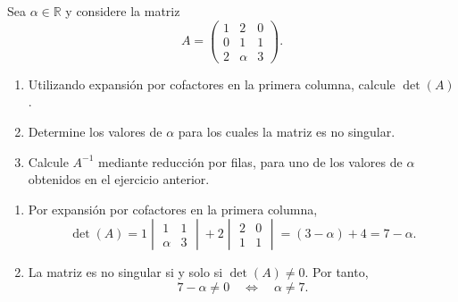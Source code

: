 \documentclass[11pt,respuestas,a4]{aleph-examen}
\begin{document}
\begin{preguntas}
\item
Sea \( \alpha \in \mathbb{R} \) y considere la matriz
\[
    A=\begin{pmatrix}
        1 & 2 & 0 \\
        0 & 1 & 1 \\
        2 & \alpha & 3
    \end{pmatrix}.
\]
\begin{enumerate}
    \item Utilizando expansión por cofactores en la primera columna, calcule \( \det(A) \).
    \item Determine los valores de \( \alpha \) para los cuales la matriz es no singular.
    \item Calcule \( A^{-1} \) mediante reducción por filas, para uno de los valores de $\alpha$ obtenidos en el ejercicio anterior.
\end{enumerate}

\begin{respuesta}
\begin{enumerate}
    \item Por expansión por cofactores en la primera columna,
    \[
        \det(A)
        =1\begin{vmatrix}1 & 1\\ \alpha & 3\end{vmatrix}
        +2\begin{vmatrix}2 & 0\\ 1 & 1\end{vmatrix}
        =(3-\alpha)+4=7-\alpha.
    \]

    \item La matriz es no singular si y solo si \(\det(A)\neq 0\). Por tanto,
    \[
        7-\alpha\neq 0 \quad \Longleftrightarrow \quad \alpha\neq 7.
    \]


\end{enumerate}
\end{respuesta}
\end{preguntas}
\end{document}
